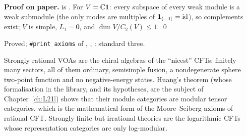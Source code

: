 \textbf{Proof on paper.}  is . For $V = {\mathbb{C}}\mathbf{1}$: every subspace of every weak
module is a weak submodule (the only modes are multiples of $\mathbf{1}_{(-1)} = \mathrm{id}$), so complements exist; $V$ is
simple, $L_1 = 0$, and $\dim V/C_2(V)\le1$. \qed

\begin{status}
Proved; \texttt{\#print axioms} of , ,
: standard three.
\end{status}

\begin{physics}
Strongly rational VOAs are the chiral algebras of the ``nicest'' CFTs: finitely many sectors, all of them ordinary,
semisimple fusion, a nondegenerate sphere two-point function and no negative-energy states. Huang's theorem (whose
formalisation in the library, and its hypotheses, are the subject of Chapter~\ref{ch:L21}) shows that their module categories are modular tensor categories, which is the mathematical form of the
Moore--Seiberg axioms of rational CFT. Strongly finite but irrational theories are the logarithmic CFTs whose
representation categories are only log-modular.
\end{physics}

